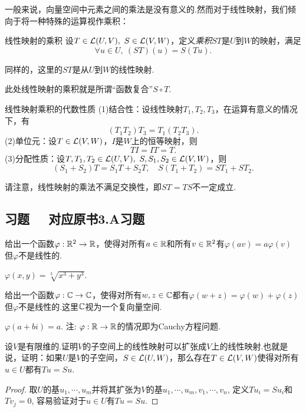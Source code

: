 一般来说，向量空间中元素之间的乘法是没有意义的.然而对于线性映射，我们倾向于将一种特殊的运算视作乘积：

\begin{definition}{线性映射的乘积}
	设$T \in \mathcal{L} (U,V),~S \in \mathcal{L} (V,W)$，定义\textit{乘积}$ST$是$U$到$W$的映射，满足$$\forall u \in U,~(ST)(u)=S(Tu).$$
\end{definition}
\begin{remark}
	同样的，这里的$ST$是从$U$到$W$的线性映射.
\end{remark}
\begin{remark}
	此处线性映射的乘积就是所谓“函数复合”$S \circ T$.
\end{remark}

\begin{proposition}{线性映射乘积的代数性质} \label{pro:xmxkykueigji}
	(1)结合性：设线性映射$T_1,T_2,T_3$，在运算有意义的情况下，有$$(T_1T_2)T_3=T_1(T_2T_3).$$
	(2)单位元：设$T \in \mathcal{L} (V,W)$，$I$是$W$上的恒等映射，则$$TI=IT=T.$$
	(3)分配性质：设$T,T_1,T_2 \in \mathcal{L} (U,V),~S,S_1,S_2 \in \mathcal{L} (V,W)$，则$$(S_1+S_2)T=S_1T+S_2T,\quad S(T_1+T_2)=ST_1+ST_2.$$
\end{proposition}

请注意，线性映射的乘法不满足交换性，即$ST=TS$不一定成立.

\subsection*{习题 ~~\small 对应原书3.A习题}

\begin{exercise}
	给出一个函数$\varphi :\mathbb{R} ^2 \to \mathbb{R}$，使得对所有$a \in \mathbb{R}$和所有$v \in \mathbb{R} ^2$有$\varphi (av)=a\varphi (v)$
	但$\varphi$不是线性的.
\end{exercise}
\begin{solution}
	$\varphi (x,y)= \sqrt[3]{x^3+y^3}$.
\end{solution}

\begin{exercise}
	给出一个函数$\varphi :\mathbb{C} \to \mathbb{C}$，使得对所有$w,z \in \mathbb{C}$都有$\varphi (w+z) = \varphi (w) + \varphi (z)$
	但$\varphi$不是线性的.这里$\mathbb{C}$视为一个复向量空间.
\end{exercise}
\begin{solution}
	$\varphi (a+bi)=a$. 注: $\varphi :\mathbb{R} \to \mathbb{R}$的情况即为Cauchy方程问题. 
\end{solution}

\begin{exercise}
	设$V$是有限维的.证明$V$的子空间上的线性映射可以扩张成$V$上的线性映射.也就是说，证明：如果$U$是$V$的子空间，$S \in \mathcal{L} (U,W)$，那么存在$T \in \mathcal{L} (V,W)$使得对所有$u \in U$都有$Tu=Su$.
\end{exercise}
\begin{proof}
	取$U$的基$u_1,\cdots ,u_m$并将其扩张为$V$的基$u_1,\cdots ,u_m,v_1,\cdots ,v_n$, 定义$Tu_i=Su_i$和$Tv_j=0$, 容易验证对于$u \in U$有$Tu=Su$. 
\end{proof}

